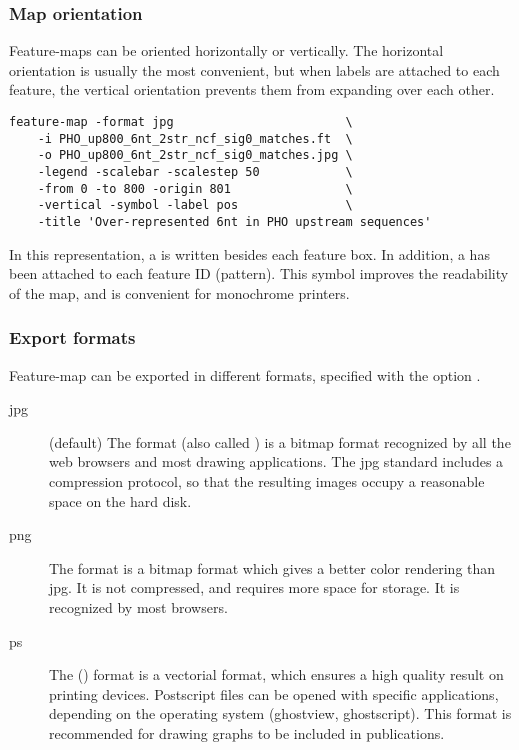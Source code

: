 \subsubsection{Map orientation}

Feature-maps can be oriented horizontally or vertically. The
horizontal orientation is usually the most convenient, but when labels
are attached to each feature, the vertical orientation prevents them
from expanding over each other.

\begin{verbatim}
feature-map -format jpg                        \
    -i PHO_up800_6nt_2str_ncf_sig0_matches.ft  \
    -o PHO_up800_6nt_2str_ncf_sig0_matches.jpg \
    -legend -scalebar -scalestep 50            \
    -from 0 -to 800 -origin 801                \
    -vertical -symbol -label pos               \
    -title 'Over-represented 6nt in PHO upstream sequences' 
\end{verbatim}

In this representation, a \concept{label} is written besides each
feature box. In addition, a \concept{symbol} has been attached to each
feature ID (pattern). This symbol improves the readability of the map, 
and is convenient for monochrome printers. 

\subsubsection{Export formats}

Feature-map can be exported in different formats, specified with the
option \option{-format}.

\begin{description}

\item[jpg] (default) The  format (also called )
is a bitmap format recognized by all the web browsers and most drawing
applications. The jpg standard includes a compression protocol, so
that the resulting images occupy a reasonable space on the hard disk.

\item[png] The  format is a bitmap format which gives a 
better color rendering than jpg. It is not compressed, and requires
more space for storage. It is recognized by most browsers.

\item[ps] The \concept{postscript} (\concept{ps}) format is a vectorial format, which
ensures a high quality result on printing devices. Postscript files
can be opened with specific applications, depending on the operating
system (ghostview, ghostscript). This format is recommended for
drawing graphs to be included in publications.

\end{description}

